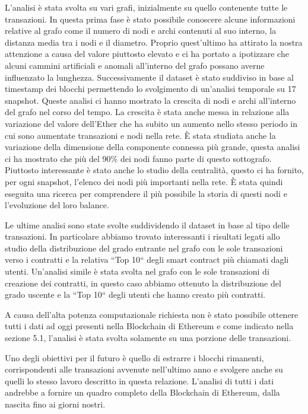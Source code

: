 \documentclass[12pt]{report}
\begin{document}
L'analisi è stata svolta su vari grafi, inizialmente su quello contenente tutte le transazioni.
In questa prima fase è stato possibile conoscere alcune informazioni relative al grafo come il numero di nodi e archi contenuti al suo interno, la distanza media tra i nodi e il diametro. Proprio quest'ultimo ha attirato la nostra attenzione a causa del valore piuttosto elevato e ci ha portato a ipotizzare che alcuni cammini artificiali e anomali all'interno del grafo possano averne influenzato la lunghezza.
Successivamente il dataset è stato suddiviso in base al timestamp dei blocchi permettendo lo svolgimento di un'analisi temporale su 17 snapshot.
Queste analisi ci hanno mostrato la crescita di nodi e archi all'interno del grafo nel corso del tempo. La crescita è stata anche messa in relazione alla variazione del valore dell'Ether che ha subito un aumento nello stesso periodo in cui sono aumentate transazioni e nodi nella rete.
È stata studiata anche la variazione della dimensione della componente connessa più grande, questa analisi ci ha mostrato che più del 90\% dei nodi fanno parte di questo sottografo.
Piuttosto interessante è stato anche lo studio della centralità, questo ci ha fornito, per ogni snapshot, l'elenco dei nodi più importanti nella rete. È stata quindi eseguita una ricerca per comprendere il più possibile la storia di questi nodi e l'evoluzione del loro balance.

Le ultime analisi sono state svolte suddividendo il dataset in base al tipo delle transazioni. In particolare abbiamo trovato interessanti i risultati legati allo studio della distribuzione del grado entrante nel grafo con le sole transazioni verso i contratti e la relativa ``Top 10`` degli smart contract più chiamati dagli utenti.
Un'analisi simile è stata svolta nel grafo con le sole transazioni di creazione dei contratti, in questo caso abbiamo ottenuto la distribuzione del grado uscente e la ``Top 10`` degli utenti che hanno creato più contratti.

A causa dell'alta potenza computazionale richiesta non è stato possibile ottenere tutti i dati ad oggi presenti nella Blockchain di Ethereum e come indicato nella sezione 5.1, l'analisi è stata svolta solamente su una porzione delle transazioni.

Uno degli obiettivi per il futuro è quello di estrarre i blocchi rimanenti, corrispondenti alle transazioni avvenute nell'ultimo anno e svolgere anche su quelli lo stesso lavoro descritto in questa relazione.
L'analisi di tutti i dati andrebbe a fornire un quadro completo della Blockchain di Ethereum, dalla nascita fino ai giorni nostri.
\end{document}
